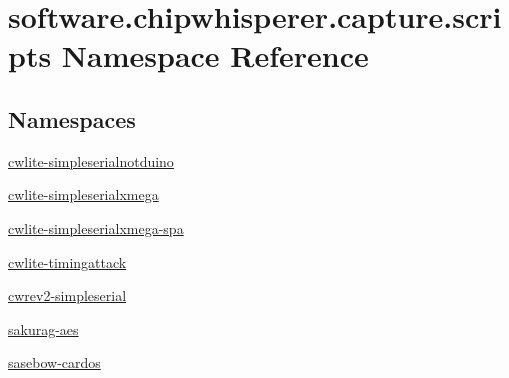 \hypertarget{namespacesoftware_1_1chipwhisperer_1_1capture_1_1scripts}{}\section{software.\+chipwhisperer.\+capture.\+scripts Namespace Reference}
\label{namespacesoftware_1_1chipwhisperer_1_1capture_1_1scripts}
\subsection*{Namespaces}
\begin{DoxyCompactItemize}
\item 
 \hyperlink{namespacesoftware_1_1chipwhisperer_1_1capture_1_1scripts_1_1cwlite-simpleserialnotduino}{cwlite-\/simpleserialnotduino}
\item 
 \hyperlink{namespacesoftware_1_1chipwhisperer_1_1capture_1_1scripts_1_1cwlite-simpleserialxmega}{cwlite-\/simpleserialxmega}
\item 
 \hyperlink{namespacesoftware_1_1chipwhisperer_1_1capture_1_1scripts_1_1cwlite-simpleserialxmega-spa}{cwlite-\/simpleserialxmega-\/spa}
\item 
 \hyperlink{namespacesoftware_1_1chipwhisperer_1_1capture_1_1scripts_1_1cwlite-timingattack}{cwlite-\/timingattack}
\item 
 \hyperlink{namespacesoftware_1_1chipwhisperer_1_1capture_1_1scripts_1_1cwrev2-simpleserial}{cwrev2-\/simpleserial}
\item 
 \hyperlink{namespacesoftware_1_1chipwhisperer_1_1capture_1_1scripts_1_1sakurag-aes}{sakurag-\/aes}
\item 
 \hyperlink{namespacesoftware_1_1chipwhisperer_1_1capture_1_1scripts_1_1sasebow-cardos}{sasebow-\/cardos}
\end{DoxyCompactItemize}
